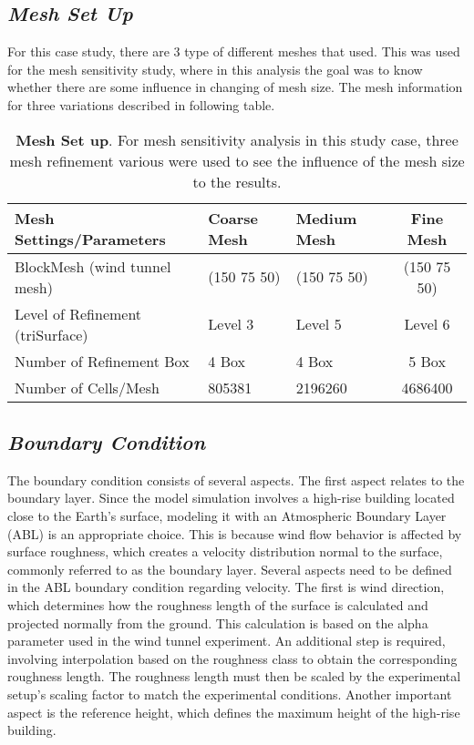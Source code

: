 \documentclass[12pt,a4paper]{cibb}
\begin{document}
\subsection{\bf \it Mesh Set Up}
For this case study, there are 3 type of different meshes that used. This was used for the mesh sensitivity study, where in this analysis the goal was to know whether there are some influence in changing of mesh size. The mesh information for three variations described in following table. 

\begin{table}[httb!] \small
\centering
\vspace{3mm}
    \begin{tabularx}{0.8\textwidth}{ l  l  l c }
        \toprule
          \textbf{Mesh Settings/Parameters} & \textbf{Coarse Mesh} & \textbf{Medium Mesh} & \textbf{Fine Mesh} \\
        \midrule
        BlockMesh (wind tunnel mesh) & (150 75 50) & (150 75 50) & (150 75 50) \\ 
	Level of Refinement (triSurface) & Level 3 & Level 5 & Level 6 \\ 
	  Number of Refinement Box & 4 Box & 4 Box & 5 Box\\ 
	Number of Cells/Mesh & 805381 & 2196260 & 4686400\\ 
        \bottomrule
    \end{tabularx}
    \caption{\textbf{Mesh Set up}.
    For mesh sensitivity analysis in this study case, three mesh refinement various were used to see the influence of the mesh size to the results.\label{tab:meshsetup}}
    \vspace{-2mm}
\end{table}

\newpage
\subsection{\bf \it Boundary Condition}
The boundary condition consists of several aspects. The first aspect relates to the boundary layer. Since the model simulation involves a high-rise building located close to the Earth's surface, modeling it with an Atmospheric Boundary Layer (ABL) is an appropriate choice. This is because wind flow behavior is affected by surface roughness, which creates a velocity distribution normal to the surface, commonly referred to as the boundary layer.
Several aspects need to be defined in the ABL boundary condition regarding velocity. The first is wind direction, which determines how the roughness length of the surface is calculated and projected normally from the ground. This calculation is based on the alpha parameter used in the wind tunnel experiment. An additional step is required, involving interpolation based on the roughness class to obtain the corresponding roughness length. The roughness length must then be scaled by the experimental setup's scaling factor to match the experimental conditions.
Another important aspect is the reference height, which defines the maximum height of the high-rise building.
\end{document}
